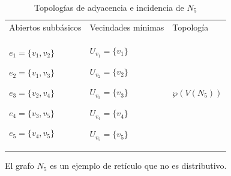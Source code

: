 \begin{table}[p]
\begin{tabular}{@{}>{\centering\arraybackslash}m{}>{\centering\arraybackslash}m{}>{\centering\arraybackslash}m{}@{}}
      \hline
      \multicolumn{3}{c}{\textbf{Topología de incidencia}} \\
      \hline
      Abiertos subbásicos & Vecindades mínimas & Topología \\
      \hline
         ${e_{1}=\{v_1,v_2\}}$\par
         ${e_{2}=\{v_1,v_3\}}$\par
         ${e_{3}=\{v_2,v_4\}}$\par
         ${e_{4}=\{v_3,v_5\}}$\par
         ${e_{5}=\{v_4,v_5\}}$
      &
         ${U_{v_1}=\{v_1\}}$\par
         ${U_{v_2}=\{v_2\}}$\par
         ${U_{v_3}=\{v_3\}}$\par
         ${U_{v_4}=\{v_4\}}$\par
         ${U_{v_5}=\{v_5\}}$
      &
         $\wp\left(V\left(N_5\right)\right)$ \\[6pt]
      \hline
   \end{tabular}
   \caption{Topologías de adyacencia e incidencia de $N_5$}
   \label{tab:topologias_N_5}

   \vspace{2em}
   \begin{minipage}{\textwidth}
      \normalsize
      El grafo $N_5$ es un ejemplo de retículo que no es distributivo.
   \end{minipage}
\end{table}
